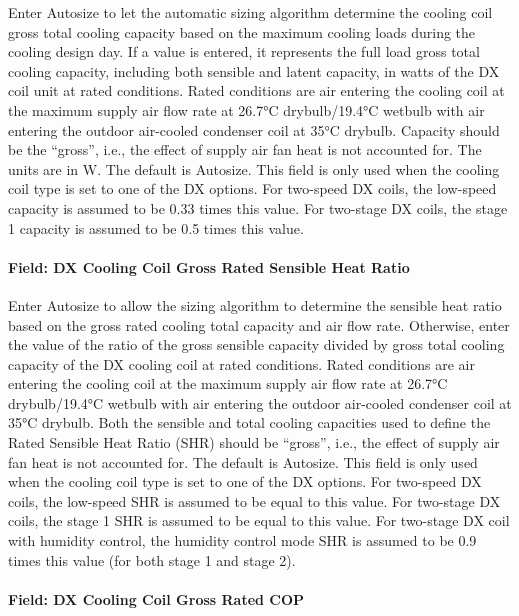 Enter Autosize to let the automatic sizing algorithm determine the cooling coil gross total cooling capacity based on the maximum cooling loads during the cooling design day. If a value is entered, it represents the full load gross total cooling capacity, including both sensible and latent capacity, in watts of the DX coil unit at rated conditions. Rated conditions are air entering the cooling coil at the maximum supply air flow rate at 26.7°C drybulb/19.4°C wetbulb with air entering the outdoor air-cooled condenser coil at 35°C drybulb. Capacity should be the ``gross'', i.e., the effect of supply air fan heat is not accounted for. The units are in W. The default is Autosize. This field is only used when the cooling coil type is set to one of the DX options. For two-speed DX coils, the low-speed capacity is assumed to be 0.33 times this value. For two-stage DX coils, the stage 1 capacity is assumed to be 0.5 times this value.

\paragraph{Field: DX Cooling Coil Gross Rated Sensible Heat Ratio}\label{field-dx-cooling-coil-gross-rated-sensible-heat-ratio-1}

Enter Autosize to allow the sizing algorithm to determine the sensible heat ratio based on the gross rated cooling total capacity and air flow rate. Otherwise, enter the value of the ratio of the gross sensible capacity divided by gross total cooling capacity of the DX cooling coil at rated conditions. Rated conditions are air entering the cooling coil at the maximum supply air flow rate at 26.7°C drybulb/19.4°C wetbulb with air entering the outdoor air-cooled condenser coil at 35°C drybulb. Both the sensible and total cooling capacities used to define the Rated Sensible Heat Ratio (SHR) should be ``gross'', i.e., the effect of supply air fan heat is not accounted for. The default is Autosize. This field is only used when the cooling coil type is set to one of the DX options. For two-speed DX coils, the low-speed SHR is assumed to be equal to this value. For two-stage DX coils, the stage 1 SHR is assumed to be equal to this value. For two-stage DX coil with humidity control, the humidity control mode SHR is assumed to be 0.9 times this value (for both stage 1 and stage 2).

\paragraph{Field: DX Cooling Coil Gross Rated COP}\label{field-dx-cooling-coil-gross-rated-cop-1}

